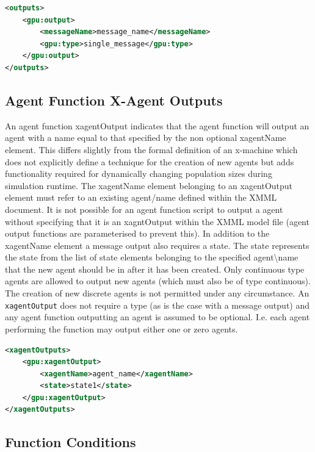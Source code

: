 \documentclass[11pt, a4paper, onecolumn, oneside]{report}
\begin{document}
\begin{lstlisting}[language=XML]
<outputs>
    <gpu:output>
        <messageName>message_name</messageName>
        <gpu:type>single_message</gpu:type>
    </gpu:output>
</outputs>
\end{lstlisting}

\subsection{Agent Function X-Agent Outputs}
\label{sec:253}

An agent function xagentOutput indicates that the agent function will output an agent with a name equal to that specified by the non optional xagentName element.
This differs slightly from the formal definition of an x-machine which does not explicitly define a technique for the creation of new agents but adds functionality required for dynamically changing population sizes during simulation runtime.
The xagentName element belonging to an xagentOutput element must refer to an existing agent/name defined within the XMML document.
It is not possible for an agent function script to output a agent without specifying that it is an xagntOutput within the XMML model file (agent output functions are parameterised to prevent this).
In addition to the xagentName element a message output also requires a state.
The state represents the state from the list of state elements belonging to the specified agent\textbackslash{}name that the new agent should be in after it has been created.
Only continuous type agents are allowed to output new agents (which must also be of type continuous).
The creation of new discrete agents is not permitted under any circumstance.
An \texttt{xagentOutput} does not require a type (as is the case with a message output) and any agent function outputting an agent is assumed to be optional.
I.e. each agent performing the function may output either one or zero agents.

\begin{lstlisting}[language=XML]
<xagentOutputs>
    <gpu:xagentOutput>
        <xagentName>agent_name</xagentName>
        <state>state1</state>
    </gpu:xagentOutput>
</xagentOutputs>
\end{lstlisting}

\subsection{Function Conditions}
\label{sec:254}
\end{document}
